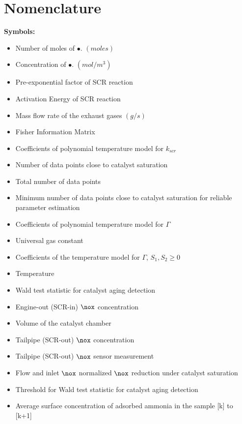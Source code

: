 \section*{Nomenclature}
\textbf{Symbols:}
\begin{itemize}[leftmargin=3.5em]
    \item[$\{\bullet\}$] Number of moles of $\bullet$. $(moles)$
    \item[$\lbrack\bullet\rbrack$] Concentration of $\bullet$. $(mol/m^3)$
    \item[$A_{scr}$] Pre-exponential factor of SCR reaction
    \item[$E_{scr}$] Activation Energy of SCR reaction
    \item[$F$] Mass flow rate of the exhaust gases $(g/s)$
    \item[$I(\theta)$] Fisher Information Matrix
    \item[$k_i$] Coefficients of polynomial temperature model for $k_{scr}$
    \item[$N_{sat}$] Number of data points close to catalyst saturation
    \item[$N$] Total number of data points
    \item[$N_{sat}^{min}$] Minimum number of data points close to catalyst saturation for reliable parameter estimation
    \item[$r_i$] Coefficients of polynomial temperature model for $\Gamma$
    \item[$R$] Universal gas constant
    \item[$S_1, S_2$] Coefficients of the temperature model for $\Gamma$, $S_1, S_2 \geq 0$
    \item[$T$] Temperature
    \item[$T_w$] Wald test statistic for catalyst aging detection
    \item[$u_1$] Engine-out (SCR-in) $\nox$ concentration
    \item[$V_{scr}$] Volume of the catalyst chamber
    \item[$x_1$] Tailpipe (SCR-out) $\nox$ concentration
    \item[$y_1$] Tailpipe (SCR-out) $\nox$ sensor measurement
    \item[$\alpha_{sat}$] Flow and inlet $\nox$ normalized $\nox$ reduction under catalyst saturation
    \item[$\beta$] Threshold for Wald test statistic for catalyst aging detection
    \item[$\gamma(k)$] Average surface concentration of adsorbed ammonia in the sample [k] to [k+1]

\end{itemize}
